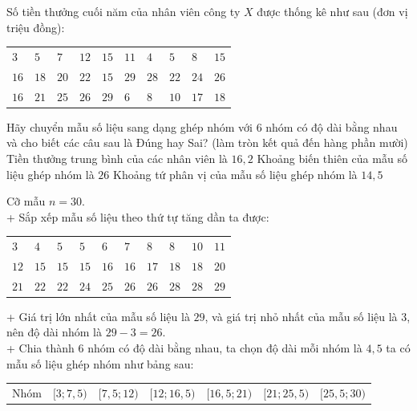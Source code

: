 \begin{ex}%
	Số tiền thưởng cuối năm của nhân viên công ty $X$ được thống kê như sau (đơn vị triệu đồng):
	\begin{center}
		\begin{tabular}{llllllllll}
			$3$ & $5$ & $7$ & $12$ & $15$ & $11$ & $4$ & $5$ & $8$ & $15$ \\
			$16$ & $18$ & $20$ & $22$ & $15$ & $29$ & $28$ & $22$ & $24$ & $26 $\\
			$16$ & $21$ & $25$ & $26$ & $29$ & $6$ & $8$ & $10$ & $17$ & $18$
		\end{tabular}
	\end{center}
	\choiceTF
	{Hãy chuyển mẫu số liệu sang dạng ghép nhóm với 6 nhóm có độ dài bằng nhau và cho biết các câu sau là Đúng hay Sai? (làm tròn kết quả đến hàng phần mười)}
	{\True Tiền thưởng trung bình của các nhân viên là $16,2$}
	{Khoảng biến thiên của mẫu số liệu ghép nhóm là $26$}
	{Khoảng tứ phân vị của mẫu số liệu ghép nhóm là $ 14,5$}
	\loigiai
	{
		\begin{itemchoice}
			\itemch Cỡ mẫu $n=30$.\\
			+ Sắp xếp mẫu số liệu theo thứ tự tăng dần ta được:
			\begin{center}
				\begin{tabular}{llllllllll}
					$3$ & $4$ & $5$ & $5$ & $6$ & $7$ & $8$ & $8$ & $10$ & $11$ \\
					$12$ & $15$ & $15$ & $15$ & $16$ & $16$ & $17$ & $18$ & $18$ & $20$ \\
					$21$ & $22$ & $22$ & $24$ & $25$ & $26$ & $26$ & $28$ & $28$ & $29$
				\end{tabular}
			\end{center}
			+ Giá trị lớn nhất của mẫu số liệu là $29$, và giá trị nhỏ nhất của mẫu số liệu là $3 $, nên độ dài nhóm là $29-3=26$.\\
			+ Chia thành $6$ nhóm có độ dài bằng nhau, ta chọn độ dài mỗi nhóm là $4,5 $ ta có mẫu số liệu ghép nhóm như bảng sau:
			\begin{center}
				\begin{tabular}{|c|c|c|c|c|c|c|}
					\hline Nhóm & {$[3 ; 7,5)$} & {$[7,5 ; 12)$} & {$[12 ; 16,5)$} & {$[16,5 ; 21)$} & {$[21 ; 25,5)$} & {$[25,5 ; 30)$} \\

\end{tabular}
\end{center}
\end{itemchoice}}
\end{ex}
